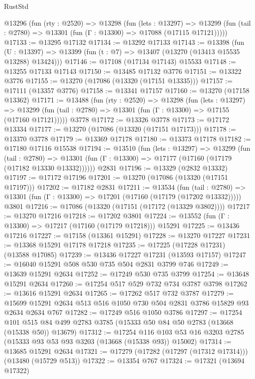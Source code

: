 \begin{lexlean}{RustStd}
\begin{coremodule}
  @13296
    (fun (rty : @2520) =>
    @13298
      (fun (lets : @13297) =>
      @13299 (fun (tail : @2780) => @13301 (fun (Γ : @13300) => @17088 (@17115 @17121)))))
@17133 := @13295 @17132
@17134 := @13292 @17133
@17143 := @13398
    (fun (U : @13397) => @13399 (fun (t : @7) => @13407 (@13270 (@13413 @15535 @13288) @13424)))
@17146 := @17108 (@17134 @17143) @15533
@17148 := @13255 @17133 @17143
@17150 := @13485 @17132 @3776
@17151 := @13322 @3776
@17155 := @13270 (@17086 (@13320 (@17151 @13335)))
@17157 := @17111 (@13357 @3776)
@17158 := @13341 @17157
@17160 := @13270 (@17158 @13362)
@17171 := @13488
    (fun (rty : @2520) =>
    @13298
      (fun (lets : @13297) =>
      @13299 (fun (tail : @2780) => @13301 (fun (Γ : @13300) => @17155 (@17160 @17121)))))
    @3778
@17172 := @13326 @3778
@17173 := @17172 @13334
@17177 := @13270 (@17086 (@13320 (@17151 @17173)))
@17178 := @13370 @3778
@17179 := @13369 @17178
@17180 := @13373 @17178
@17182 := @17180 @17116 @15538
@17194 := @13510
    (fun (lets : @13297) =>
    @13299
      (fun (tail : @2780) =>
      @13301 (fun (Γ : @13300) => @17177 (@17160 (@17179 (@17182 @13330 @13332))))))
    @2831
@17196 := @13329 (@2832 @13332)
@17197 := @17172 @17196
@17201 := @13270 (@17086 (@13320 (@17151 @17197)))
@17202 := @17182 @2831
@17211 := @13534
    (fun (tail : @2780) => @13301 (fun (Γ : @13300) => @17201 (@17160 (@17179 (@17202 @13332)))))
    @3801
@17216 := @17086 (@13320 (@17151 (@17172 (@13329 @3802))))
@17217 := @13270 @17216
@17218 := @17202 @3801
@17224 := @13552 (fun (Γ : @13300) => @17217 (@17160 (@17179 @17218))) @15291
@17225 := @13436 @17216
@17227 := @17158 (@13361 @15291)
@17228 := @13270 @17227
@17231 := @13368 @15291 @17178 @17218
@17235 := @17225 (@17228 @17231) (@13588 @17085)
@17239 := @13436 @17227 @17231 (@13593 @17157)
@17247 := @16040 @15291 @508 @530 @735 @504 @2831 @3799 @746
@17249 := @13639 @15291 @2634
@17252 := @17249 @530 @735 @3799
@17254 := @13648 @15291 @2634
@17260 := @17254 @517 @529 @732 @734 @3787 @3798
@17262 := @13616 @15291 @2634
@17265 := @17262 @517 @732 @3787
@17279 := @15699 @15291 @2634 @513 @516 @1050 @730 @504 @2831 @3786 @15829 @93 @2634 @2634 @767
@17282 := @17249 @516 @1050 @3786
@17297 := @17254
    @101
    @515
    @84
    @499
    @2783
    @3785
    (@15333 @50 @84 @50 @2783 (@13668 (@15338 @50)) @13679)
@17312 := @17254
    @116
    @103
    @53
    @16
    @3203
    @2785
    (@15333 @93 @53 @93 @3203 (@13668 (@15338 @93)) @15002)
@17314 := @13685 @15291 @2634
@17321 := @17279 (@17282 (@17297 (@17312 @17314))) (@13480 (@15729 @513))
@17322 := @13354 @767
@17324 := @17321 (@13694 @17322)

\end{coremodule}
\end{lexlean}
